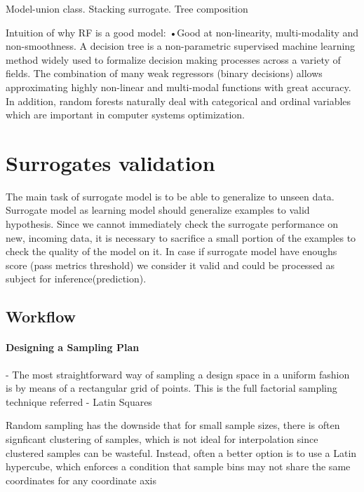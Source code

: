     Model-union class.  Stacking surrogate.  Tree composition

    Intuition of why RF is a good model: •Good at non-linearity, multi-modality and non-smoothness. A decision tree is a non-parametric supervised machine learning method widely used to formalize decision making processes across a variety of fields. The combination of many weak regressors (binary decisions) allows approximating highly non-linear and multi-modal functions with great accuracy. In addition, random forests naturally deal with categorical and ordinal variables which are important in computer systems optimization.


\section{Surrogates validation}
The main task of surrogate model is to be able to generalize to unseen data. Surrogate model as learning model should generalize examples to valid hypothesis. 
Since we cannot immediately check the surrogate performance on new, incoming data, it is necessary to sacrifice a small portion of the examples to check the quality of the model on it. In case if surrogate model have enoughs score (pass metrics threshold) we consider it valid and could be processed as subject for inference(prediction).

    \subsection{Workflow}
    \paragraph{Designing a Sampling Plan} - The most straightforward way of sampling a design space in a uniform fashion is by \cite{EngSurMod}
    means of a rectangular grid of points. This is the full factorial sampling technique referred
    - Latin Squares

    Random sampling has the downside that for small sample sizes, there is often signficant clustering of samples, which is not ideal for interpolation since clustered samples can be wasteful. Instead, often a better option is to use a Latin hypercube, which enforces a condition that sample bins may not share the same coordinates for any coordinate axis


